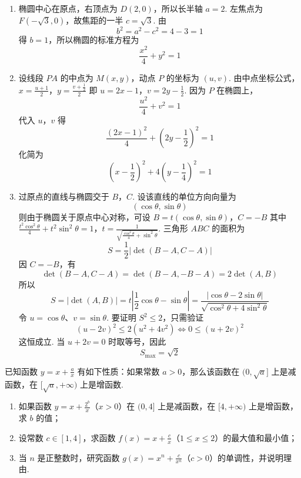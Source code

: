 \begin{solution}
\begin{enumerate}
\item 椭圆中心在原点，右顶点为 \(D(2,0)\)，所以长半轴 \(a=2\). 左焦点为 \(F(-\sqrt3,0)\)，故焦距的一半 \(c=\sqrt3\). 由
\[
b^2=a^2-c^2=4-3=1
\]
得 \(b=1\)，所以椭圆的标准方程为
\[
\frac{x^2}{4}+y^2=1
\]
\item 设线段 \(PA\) 的中点为 \(M(x,y)\)，动点 \(P\) 的坐标为 \((u,v)\). 由中点坐标公式，
\(x=\frac{u+1}{2}\)，\(y=\frac{v+\frac12}{2}\)
即
\(u=2x-1\)，\(v=2y-\frac12\).
因为 \(P\) 在椭圆上，
\[
\frac{u^2}{4}+v^2=1
\]
代入 \(u\)，\(v\) 得
\[
\frac{(2x-1)^2}{4}+\left(2y-\frac12\right)^2=1
\]
化简为
\[
\left(x-\frac12\right)^2+4\left(y-\frac14\right)^2=1
\]
\item 过原点的直线与椭圆交于 \(B\)，\(C\). 设该直线的单位方向向量为
\[
(\cos\theta,\sin\theta)
\]
则由于椭圆关于原点中心对称，可设
\(B=t(\cos\theta,\sin\theta)\)，\(C=-B\)
其中
\(\frac{t^2\cos^2\theta}{4}+t^2\sin^2\theta=1\)，\(t=\frac{1}{\sqrt{\frac{\cos^2\theta}{4}+\sin^2\theta}}\).
三角形 \(ABC\) 的面积为
\[
S=\frac12\left|\det(B-A,C-A)\right|
\]
因 \(C=-B\)，有
\[
\det(B-A,C-A)
=\det(B-A,-B-A)
=2\det(A,B)
\]
所以
\[
S=|\det(A,B)|
=t\left|\frac12\cos\theta-\sin\theta\right|
=\frac{|\cos\theta-2\sin\theta|}
{\sqrt{\cos^2\theta+4\sin^2\theta}}
\]
令 \(u=\cos\theta\)、\(v=\sin\theta\). 要证明 \(S^2\leqslant2\)，只需验证
\[
(u-2v)^2\leqslant2(u^2+4v^2)
\iff 0\leqslant(u+2v)^2
\]
这恒成立. 当 \(u+2v=0\) 时取等号，因此
\[
S_{\max}=\sqrt2
\]
\end{enumerate}
\end{solution}

\begin{problem}
已知函数 \(y = x + \frac{a}{x}\) 有如下性质：如果常数 \(a > 0\)，那么该函数在 \((0, \sqrt{a}]\) 上是减函数，在 \([\sqrt{a}, +\infty)\) 上是增函数.
\begin{enumerate}
\item 如果函数 \(y = x + \frac{2^b}{x}\)（\(x > 0\)）在 \((0,4]\) 上是减函数，在 \([4, +\infty)\) 上是增函数，求 \(b\) 的值；
\item 设常数 \(c \in [1,4]\)，求函数 \(f(x) = x + \frac{c}{x}\)（\(1 \leqslant x \leqslant 2\)）的最大值和最小值；
\item 当 \(n\) 是正整数时，研究函数 \(g(x) = x^n + \frac{c}{x^n}\)（\(c > 0\)）的单调性，并说明理由.
\end{enumerate}
\end{problem}

